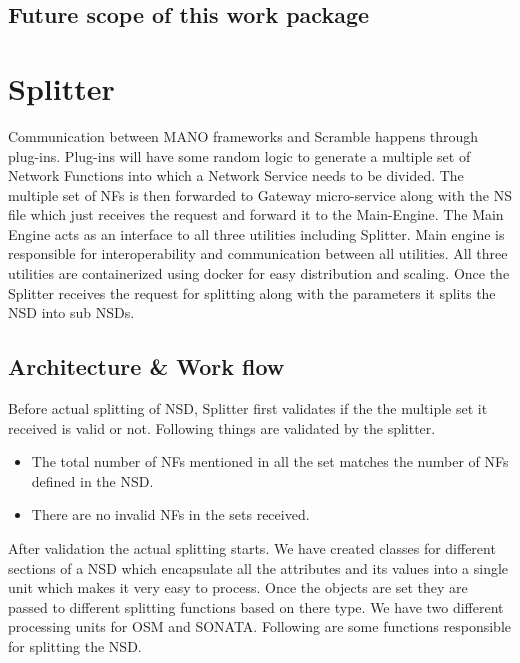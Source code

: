 \subsection{Future scope of this work package}

\section{Splitter}
Communication between MANO frameworks and Scramble happens through plug-ins. Plug-ins will have some random logic to generate a multiple set of Network Functions into which a Network Service needs to be divided. The multiple set of NFs is then forwarded to Gateway micro-service along with the NS file which just receives the request and forward it to the Main-Engine. The Main Engine acts as an interface to all three utilities including Splitter. Main engine is responsible for interoperability and communication between all utilities. All three utilities are containerized using docker for easy distribution and scaling. Once the Splitter receives the request for splitting along with the parameters it splits the NSD into sub NSDs.
\subsection{Architecture \& Work flow}
Before actual splitting of NSD, Splitter first validates if the the multiple set it received is valid or not. Following things are validated by the splitter.
\begin{itemize}
	\item The total number of NFs mentioned in all the set matches the number of NFs defined in the NSD.
	\item There are no invalid NFs in the sets received.
\end{itemize}

After validation the actual splitting starts. We have created classes for different sections of a NSD which encapsulate all the attributes and its values into a single unit which makes it very easy to process. Once the objects are set they are passed to different splitting functions based on there type. We have two different processing units for OSM and SONATA. Following are some functions responsible for splitting the NSD.

